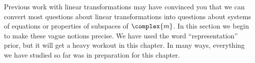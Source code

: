 \begin{para}Previous work with linear transformations may have convinced you that we can convert most questions about linear transformations into questions about systems of equations or properties of subspaces of $\complex{m}$.  In this section we begin to make these vague notions precise.   We have used the word ``representation'' prior, but it will get a heavy workout in this chapter.  In many ways, everything we have studied so far was in preparation for this chapter.\end{para}